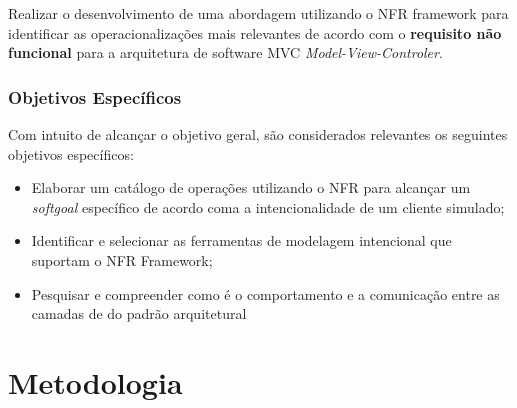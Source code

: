 Realizar o desenvolvimento de uma abordagem utilizando o NFR framework para identificar as operacionalizações mais relevantes de acordo com o \textbf{requisito não funcional} para a arquitetura de software MVC \textit{Model-View-Controler}. 

\subsection{Objetivos Específicos}

Com intuito de alcançar o objetivo geral, são considerados relevantes os seguintes objetivos específicos:

\begin{itemize}
	
	\item Elaborar um catálogo de operações utilizando o NFR para alcançar um \textit{softgoal} específico de acordo coma a intencionalidade de um cliente simulado;
	
	\item Identificar e selecionar as ferramentas de modelagem intencional que suportam o NFR Framework;
	
	\item Pesquisar e compreender como é o comportamento e a comunicação entre as camadas de do padrão arquitetural 
\end{itemize}

\chapter{Metodologia}